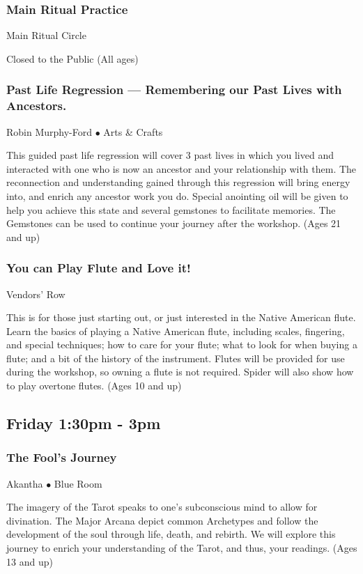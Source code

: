 \subsubsection{Main Ritual Practice}
\label{Fri-Prac3}
{\small  Main Ritual Circle}

 Closed to the Public {\small (All ages)}

\subsubsection{Past Life Regression --- Remembering our Past Lives with Ancestors.}
\label{Fri-Ford1}
{\small Robin Murphy-Ford $\bullet$  Arts \& Crafts}

 This guided past life regression will cover 3 past lives in which you lived and interacted with one who is now an ancestor and your relationship with them.  The reconnection and understanding gained through this regression will bring energy into, and enrich any ancestor work you do.  Special anointing oil will be given to help you achieve this state and several gemstones to facilitate memories.  The Gemstones can be used to continue your journey after the workshop.  {\small (Ages 21 and up)}

\subsubsection{You can Play Flute and Love it!}
\label{Fri-Spider1}
{\small  Vendors' Row}

 This is for those just starting out, or just interested in the Native American flute. Learn the basics of playing a Native American flute, including scales, fingering, and special techniques; how to care for your flute; what to look for when buying a flute; and a bit of the history of the instrument. Flutes will be provided for use during the workshop, so owning a flute is not required. Spider will also show how to play overtone flutes. {\small (Ages 10 and up)}

\subsection{Friday 1:30pm - 3pm}

\subsubsection{The Fool's Journey}
\label{Fri-Akantha1}
{\small Akantha $\bullet$  Blue Room}

 The imagery of the Tarot speaks to one's subconscious mind to allow for divination. The Major Arcana depict common Archetypes and follow the development of the soul through life, death, and rebirth. We will explore this journey to enrich your understanding of the Tarot, and thus, your readings. {\small (Ages 13 and up)}

